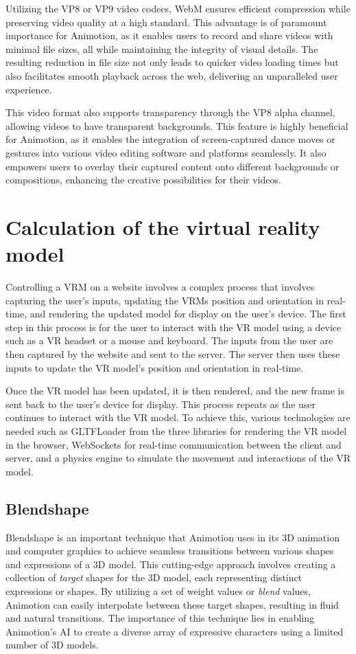 Utilizing the VP8 or VP9 video codecs, WebM ensures efficient compression while preserving 
video quality at a high standard. This advantage is of paramount importance for Animotion, 
as it enables users to record and share videos with minimal file sizes, all while maintaining the integrity of visual details. 
The resulting reduction in file size not only leads to quicker video loading times but also facilitates smooth 
playback across the web, delivering an unparalleled user experience.

This video format also supports transparency through the VP8 alpha channel, allowing videos to have 
transparent backgrounds. This feature is highly beneficial for Animotion, as it enables the integration 
of screen-captured dance moves or gestures into various video editing software and platforms seamlessly. 
It also empowers users to overlay their captured content onto different backgrounds or compositions, 
enhancing the creative possibilities for their videos. \cite{webm}

\section{Calculation of the virtual reality model} 
Controlling a VRM on a website involves a complex process that involves 
capturing the user's inputs, updating the VRMs position and orientation in real-time, 
and rendering the updated model for display on the user's device.
The first step in this process is for the user to interact with the VR model 
using a device such as a VR headset or a mouse and keyboard. The inputs from the 
user are then captured by the website and sent to the server. The server then 
uses these inputs to update the VR model's position and orientation in real-time. 

Once the VR model has been updated, it is then rendered, and the new frame is 
sent back to the user's device for display. This process repeats as the user 
continues to interact with the VR model. 
To achieve this, various technologies are needed such as GLTFLoader from the three
libraries for rendering the VR model in the browser, WebSockets for real-time 
communication between the client and server, and a physics engine to simulate 
the movement and interactions of the VR model. 

\subsection{Blendshape}
Blendshape is an important technique that Animotion uses in its 3D animation and computer graphics to 
achieve seamless transitions between various shapes and expressions of a 3D model. This cutting-edge approach 
involves creating a collection of \emph{target} shapes for the 3D model, each representing distinct 
expressions or shapes. By utilizing a set of weight values or \emph{blend} values, Animotion can easily 
interpolate between these target shapes, resulting in fluid and natural transitions. The importance of this technique 
lies in enabling Animotion's AI to create a diverse array of expressive characters using a limited number of 3D models.

